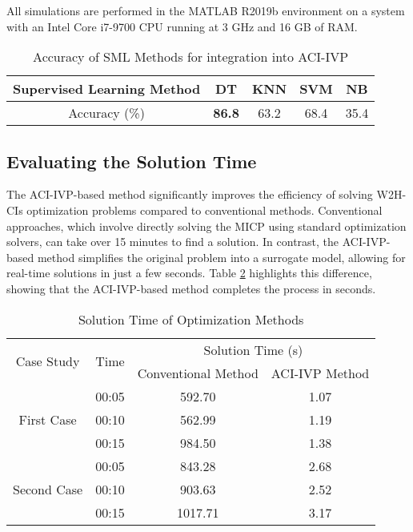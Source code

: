 \documentclass[conference]{IEEEtran}
\begin{document}
All simulations are performed in the MATLAB R2019b environment on a system with an Intel Core i7-9700 CPU running at 3 GHz and 16 GB of RAM.
\begin{table}[!t]
\centering
\caption{Accuracy of SML Methods for integration into ACI-IVP}
\vspace{-.2cm}
\label{tab:SML_accuracy}
\footnotesize
\begin{tabular}{ccccc}
\hline\hline
Supervised Learning Method & DT & KNN & SVM & NB \\ \hline
Accuracy (\%) & \textbf{86.8} & 63.2 & 68.4 & 35.4 \\ 
\hline\hline
\end{tabular}
\vspace{-.5cm}
\end{table}





\subsection{Evaluating the Solution Time}

The ACI-IVP-based method significantly improves the efficiency of solving W2H-CIs optimization problems compared to conventional methods. Conventional approaches, which involve directly solving the MICP using standard optimization solvers, can take over 15 minutes to find a solution. In contrast, the ACI-IVP-based method simplifies the original problem into a surrogate model, allowing for real-time solutions in just a few seconds. Table \ref{tab:soltime} highlights this difference, showing that the ACI-IVP-based method completes the process in seconds.

\begin{table}[b!]
      \vspace{-.5cm}
\centering
\caption{Solution Time of Optimization Methods}
\vspace{-.2cm}
\label{tab:soltime}
\footnotesize
\begin{tabular}{cccc}
\hline\hline
\multicolumn{1}{c}{\multirow{2}{*}{Case Study}}  & \multirow{2}{*}{Time} & \multicolumn{2}{c}{Solution Time (s)}                 \\ \cline{3-4} 
       &      &  \multicolumn{1}{c}{Conventional Method} & ACI-IVP Method \\ \hline \hline
\multirow{3}{*}{First Case}  &00:05 & \multicolumn{1}{c}{592.70}            & 1.07   \\ 
&00:10  & \multicolumn{1}{c}{562.99}      &1.19       \\ 
&00:15  & \multicolumn{1}{c}{984.50}      &1.38      \\ 
\hline 
\multirow{3}{*}{Second Case}  &00:05 & \multicolumn{1}{c}{843.28}            & 2.68   \\ 
&00:10  & \multicolumn{1}{c}{903.63}      &2.52       \\ 
&00:15  & \multicolumn{1}{c}{1017.71}      &3.17      \\ 
\hline \hline
\end{tabular}
\end{table}
\end{document}
